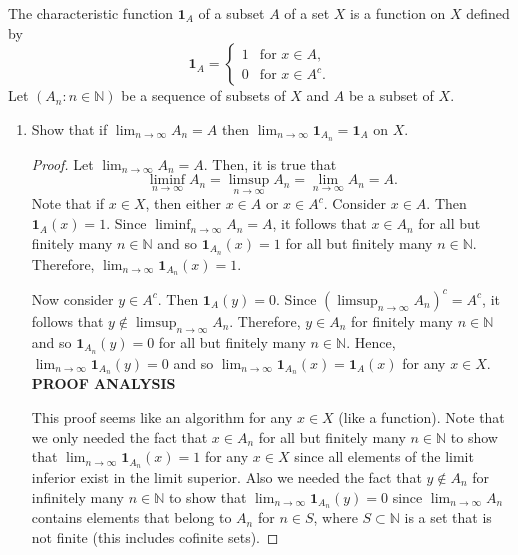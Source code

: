 \documentclass[12pt]{article}
\newcommand{\N}{\mathbb{N}}
\newenvironment{problem}[2][Problem]{\begin{trivlist}
		\item[\hskip \labelsep {\bfseries #1}\hskip \labelsep {\bfseries #2.}]}{\end{trivlist}}
\begin{document}
\begin{problem}{1.6}
	The characteristic function $\textbf{1}_{A}$ of a subset $A$ of a set $X$ is a function on $X$ defined by 
	\begin{equation*}
		\textbf{1}_{A} = \begin{cases}
			1 & \text{for }x\in A,\\
			0 & \text{for }x\in A^{c}.
		\end{cases}
	\end{equation*}
	Let $\left(A_{n}: n \in \N \right)$ be a sequence of subsets of $X$ and $A$ be a subset of $X$.
	\begin{enumerate}[label= \textbf{(\alph*)}]
		\item Show that if $\lim_{n \to \infty} A_{n} = A$ then $\lim_{n \to \infty} \textbf{1}_{A_{n}} = \textbf{1}_{A}$ on $X$.
		\begin{proof}
			Let $\lim_{n \to \infty} A_{n} = A$. Then, it is true that 
			\begin{equation*}
				\liminf_{n \to \infty} A_{n} = \limsup_{n\to \infty} A_{n} = \lim_{n \to \infty} A_{n} = A.
			\end{equation*}
			Note that if $x\in X$, then either $x\in A$ or $x\in A^{c}$. Consider $x\in A$. Then $\textbf{1}_{A} (x) = 1$. Since $\liminf_{n\to \infty} A_{n} = A$, it follows that $x\in A_{n}$ for all but finitely many $n\in \N$ and so $\textbf{1}_{A_{n}} (x) = 1$ for all but finitely many $n\in \N$. Therefore, $ \lim_{n \to \infty} \textbf{1}_{A_{n}}  (x) = 1$.
			
			 Now consider $y\in A^{c}$. Then $\textbf{1}_{A} (y) = 0$. Since $\left(\limsup_{n\to \infty} A_{n}\right)^{c} = A^{c}$, it follows that $y\not\in \limsup_{n\to \infty} A_{n}$. Therefore, $y\in A_{n}$ for finitely many $n\in \N$ and so $\textbf{1}_{A_{n}} (y) = 0$ for all but finitely many $n\in \N$. Hence, $\lim_{n\to \infty} \textbf{1}_{A_{n}} (y) = 0$ and so $\lim_{n \to \infty} \textbf{1}_{A_{n}} (x) = \textbf{1}_{A} (x)$ for any $x\in X$.\\
			 
			 \textbf{PROOF ANALYSIS}
			 
			 This proof seems like an algorithm for any $x\in X$ (like a function). Note that we only needed the fact that $x\in A_{n}$ for all but finitely many $n\in \N$ to show that $\lim_{n \to \infty} \textbf{1}_{A_{n}} (x) = 1$  for any $x\in X$ since all elements of the limit inferior exist in the limit superior. Also we needed the fact that $y\not\in A_{n}$ for infinitely many $n\in \N$ to show that $\lim_{n \to \infty} \textbf{1}_{A_{n}} (y) = 0$ since $\lim_{n \to \infty} A_{n}$ contains elements that belong to $A_{n}$ for $n\in S$, where $S\subset \N$ is a set that is not finite (this includes cofinite sets).
		\end{proof}
	

\end{enumerate}
\end{problem}
\end{document}
